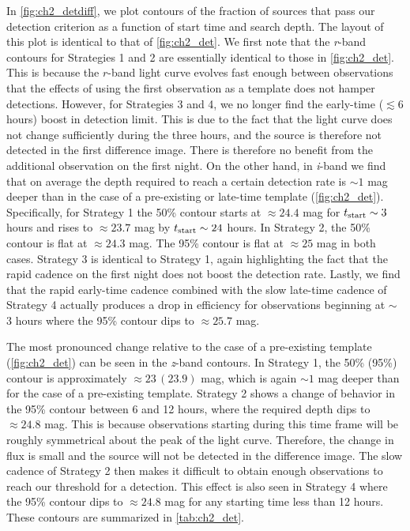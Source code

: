 In \autoref{fig:ch2_detdiff}, we plot contours of the fraction of sources that pass our detection criterion as a function of start time and search depth. The layout of this plot is identical to that of \autoref{fig:ch2_det}. We first note that the {\em r}-band contours for Strategies 1 and 2 are essentially identical to those in \autoref{fig:ch2_det}. This is because the $r$-band light curve evolves fast enough between observations that the effects of using the first observation as a template does not hamper detections. However, for Strategies 3 and 4, we no longer find the early-time ($\lesssim6$ hours) boost in detection limit. This is due to the fact that the light curve does not change sufficiently during the three hours, and the source is therefore not detected in the first difference image. There is therefore no benefit from the additional observation on the first night. On the other hand, in {\em i}-band we find that on average the depth required to reach a certain detection rate is $\sim 1$ mag deeper than in the case of a pre-existing or late-time template (\autoref{fig:ch2_det}). Specifically, for Strategy 1 the 50\% contour starts at $\approx24.4$ mag for $t_{{\rm start}} \sim 3$ hours and rises to $\approx 23.7$ mag by $t_{{\rm start}} \sim24$ hours. In Strategy 2, the 50\% contour is flat at $\approx24.3$ mag. The 95\% contour is flat at $\approx25$ mag in both cases. Strategy 3 is identical to Strategy 1, again highlighting the fact that the rapid cadence on the first night does not boost the detection rate. Lastly, we find that the rapid early-time cadence combined with the slow late-time cadence of Strategy 4 actually produces a drop in efficiency for observations beginning at $\sim$ 3 hours where the 95\% contour dips to $\approx 25.7$ mag.

The most pronounced change relative to the case of a pre-existing template (\autoref{fig:ch2_det}) can be seen in the {\em z}-band contours. In Strategy 1, the 50\% (95\%) contour is approximately $\approx 23\,(23.9)$ mag, which is again $\sim 1$ mag deeper than for the case of a pre-existing template. Strategy 2 shows a change of behavior in the 95\% contour between 6 and 12 hours, where the required depth dips to $\approx 24.8$ mag. This is because observations starting during this time frame will be roughly symmetrical about the peak of the light curve. Therefore, the change in flux is small and the source will not be detected in the difference image. The slow cadence of Strategy 2 then makes it difficult to obtain enough observations to reach our threshold for a detection. This effect is also seen in Strategy 4 where the 95\% contour dips to $\approx 24.8$ mag for any starting time less than 12 hours. These contours are summarized in \autoref{tab:ch2_det}.

